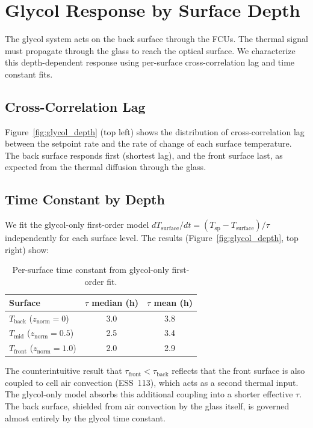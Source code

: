 \documentclass[11pt]{article}
\begin{document}
\section{Glycol Response by Surface Depth}
\label{sec:glycol_depth}

The glycol system acts on the back surface through the FCUs.  The
thermal signal must propagate through the glass to reach the optical
surface.  We characterize this depth-dependent response using
per-surface cross-correlation lag and time constant fits.

\subsection{Cross-Correlation Lag}

Figure~\ref{fig:glycol_depth} (top left) shows the distribution of
cross-correlation lag between the setpoint rate and the rate of change
of each surface temperature.  The back surface responds first
(shortest lag), and the front surface last, as expected from the
thermal diffusion through the glass.

\subsection{Time Constant by Depth}

We fit the glycol-only first-order model
$dT_\mathrm{surface}/dt = (T_\mathrm{sp} - T_\mathrm{surface})/\tau$
independently for each surface level.  The results
(Figure~\ref{fig:glycol_depth}, top right) show:

\begin{table}[htbp]
\centering
\caption{Per-surface time constant from glycol-only first-order fit.}
\label{tab:tau_surface}
\begin{tabular}{lcc}
\toprule
Surface & $\tau$ median (h) & $\tau$ mean (h) \\
\midrule
$T_\mathrm{back}$  ($z_\mathrm{norm}=0$)   & 3.0 & 3.8 \\
$T_\mathrm{mid}$   ($z_\mathrm{norm}=0.5$) & 2.5 & 3.4 \\
$T_\mathrm{front}$ ($z_\mathrm{norm}=1.0$) & 2.0 & 2.9 \\
\bottomrule
\end{tabular}
\end{table}

The counterintuitive result that $\tau_\mathrm{front} < \tau_\mathrm{back}$
reflects that the front surface is also coupled to cell air convection
(ESS~113), which acts as a second thermal input.  The glycol-only model
absorbs this additional coupling into a shorter effective $\tau$.
The back surface, shielded from air convection by the glass itself,
is governed almost entirely by the glycol time constant.
\end{document}

